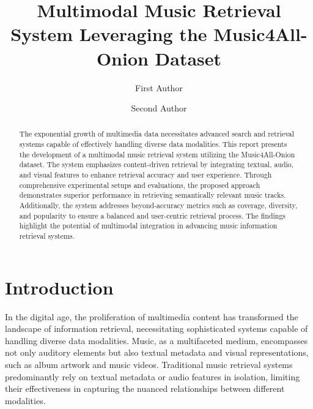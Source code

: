 \documentclass[sigconf]{acmart}
\begin{document}
\title{Multimodal Music Retrieval System Leveraging the Music4All-Onion Dataset}

\author{First Author}

\author{Second Author}

\renewcommand{\shortauthors}{First Author et al.}

\begin{abstract}
The exponential growth of multimedia data necessitates advanced search and retrieval systems capable of effectively handling diverse data modalities. This report presents the development of a multimodal music retrieval system utilizing the Music4All-Onion dataset. The system emphasizes content-driven retrieval by integrating textual, audio, and visual features to enhance retrieval accuracy and user experience. Through comprehensive experimental setups and evaluations, the proposed approach demonstrates superior performance in retrieving semantically relevant music tracks. Additionally, the system addresses beyond-accuracy metrics such as coverage, diversity, and popularity to ensure a balanced and user-centric retrieval process. The findings highlight the potential of multimodal integration in advancing music information retrieval systems.
\end{abstract}

\maketitle

\section{Introduction}
\label{sec:introduction}

In the digital age, the proliferation of multimedia content has transformed the landscape of information retrieval, necessitating sophisticated systems capable of handling diverse data modalities. Music, as a multifaceted medium, encompasses not only auditory elements but also textual metadata and visual representations, such as album artwork and music videos. Traditional music retrieval systems predominantly rely on textual metadata or audio features in isolation, limiting their effectiveness in capturing the nuanced relationships between different modalities.
\end{document}
